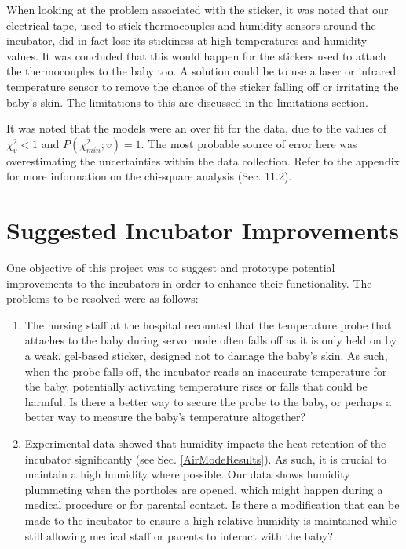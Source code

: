 \documentclass{article}
\begin{document}
\vspace{3mm}

When looking at the problem associated with the sticker, it was noted that our electrical tape, used to stick thermocouples and humidity sensors around the incubator, did in fact lose its stickiness at high temperatures and humidity values. It was concluded that this would happen for the stickers used to attach the thermocouples to the baby too. A solution could be to use a laser or infrared temperature sensor to remove the chance of the sticker falling off or irritating the baby’s skin. The limitations to this are discussed in the limitations section.

\vspace{3mm}


It was noted that the models were an over fit for the data, due to the values of $\chi^{2}_{v} < 1$ and $P(\chi^{2}_{min};v) = 1$. The most probable source of error here was overestimating the uncertainties within the data collection. Refer to the appendix for more information on the chi-square analysis (Sec. 11.2).

\section{Suggested Incubator Improvements}

One objective of this project was to suggest and prototype potential improvements to the incubators in order to enhance their functionality. The problems to be resolved were as follows: 

\begin{enumerate}

\item The nursing staff at the hospital recounted that the temperature probe that attaches to the baby during servo mode often falls off as it is only held on by a weak, gel-based sticker, designed not to damage the baby’s skin. As such, when the probe falls off, the incubator reads an inaccurate temperature for the baby, potentially activating temperature rises or falls that could be harmful. Is there a better way to secure the probe to the baby, or perhaps a better way to measure the baby’s temperature altogether? 

\item Experimental data showed that humidity impacts the heat retention of the incubator significantly (see Sec. \ref{AirModeResults}). As such, it is crucial to maintain a high humidity where possible. Our data shows humidity plummeting when the portholes are opened, which might happen during a medical procedure or for parental contact. Is there a modification that can be made to the incubator to ensure a high relative humidity is maintained while still allowing medical staff or parents to interact with the baby? 

\end{enumerate}
\end{document}
